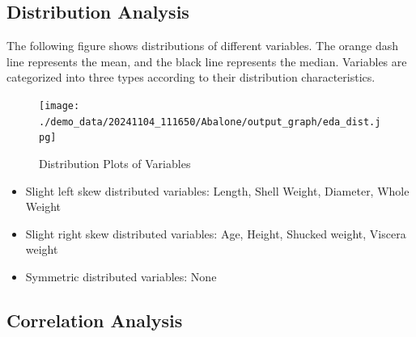 \documentclass{article}
\begin{document}
\subsection{Distribution Analysis}
The following figure shows distributions of different variables. The orange dash line represents the mean, 
and the black line represents the median. Variables are categorized into three types according to their distribution characteristics.

\begin{figure}[H]
\centering
\texttt{[image: ./demo\_data/20241104\_111650/Abalone/output\_graph/eda\_dist.jpg]}
\caption{\label{fig:dist}Distribution Plots of Variables}
\end{figure}

\begin{itemize}
\item Slight left skew distributed variables: Length, Shell Weight, Diameter, Whole Weight
\item Slight right skew distributed variables: Age, Height, Shucked weight, Viscera weight
\item Symmetric distributed variables: None
\end{itemize}

\subsection{Correlation Analysis}
\end{document}

